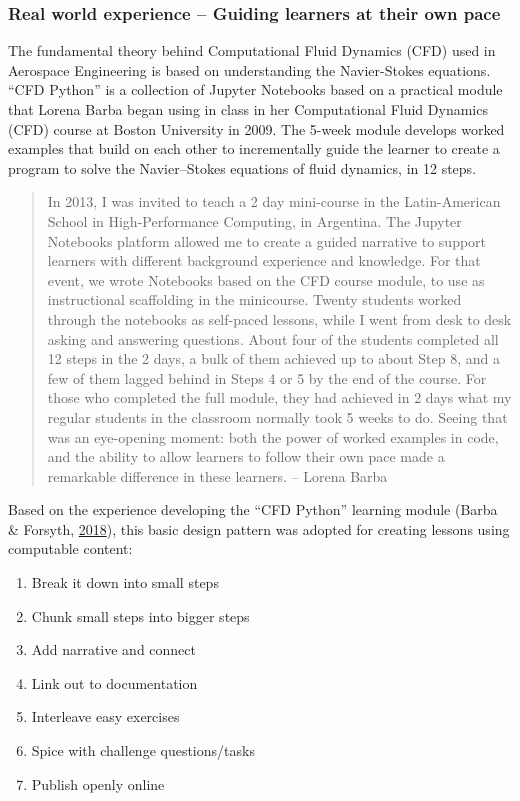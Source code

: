 \documentclass[]{book}
\providecommand{\tightlist}{%
  \setlength{\itemsep}{0pt}\setlength{\parskip}{0pt}}
\begin{document}
\subsubsection{Real world experience -- Guiding learners at their own
pace}\label{real-world-experience-guiding-learners-at-their-own-pace}

The fundamental theory behind Computational Fluid Dynamics (CFD) used in
Aerospace Engineering is based on understanding the Navier-Stokes
equations. ``CFD Python'' is a collection of Jupyter Notebooks based on
a practical module that Lorena Barba began using in class in her
Computational Fluid Dynamics (CFD) course at Boston University in 2009.
The 5-week module develops worked examples that build on each other to
incrementally guide the learner to create a program to solve the
Navier--Stokes equations of fluid dynamics, in 12 steps.

\begin{quote}
In 2013, I was invited to teach a 2 day mini-course in the
Latin-American School in High-Performance Computing, in Argentina. The
Jupyter Notebooks platform allowed me to create a guided narrative to
support learners with different background experience and knowledge. For
that event, we wrote Notebooks based on the CFD course module, to use as
instructional scaffolding in the minicourse. Twenty students worked
through the notebooks as self-paced lessons, while I went from desk to
desk asking and answering questions. About four of the students
completed all 12 steps in the 2 days, a bulk of them achieved up to
about Step 8, and a few of them lagged behind in Steps 4 or 5 by the end
of the course. For those who completed the full module, they had
achieved in 2 days what my regular students in the classroom normally
took 5 weeks to do. Seeing that was an eye-opening moment: both the
power of worked examples in code, and the ability to allow learners to
follow their own pace made a remarkable difference in these learners. --
Lorena Barba
\end{quote}

Based on the experience developing the ``CFD Python'' learning module
(Barba \& Forsyth, \protect\hyperlink{ref-barbacfd}{2018}), this basic
design pattern was adopted for creating lessons using computable
content:

\begin{enumerate}
\def\labelenumi{\arabic{enumi}.}
\tightlist
\item
  Break it down into small steps
\item
  Chunk small steps into bigger steps
\item
  Add narrative and connect
\item
  Link out to documentation
\item
  Interleave easy exercises
\item
  Spice with challenge questions/tasks
\item
  Publish openly online
\end{enumerate}
\end{document}
